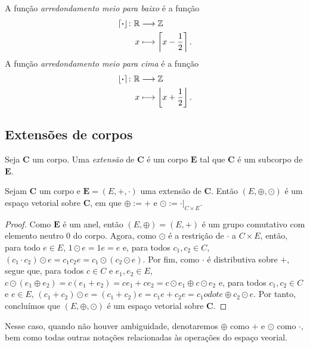 \begin{definition}
A função \emph{arredondamento meio para baixo} é a função
	\begin{align*}
	{\left\lceil{\bm{\cdot}}\right\rfloor}\colon {\mathbb{R}} &\longrightarrow {\mathbb{Z}} \\{x} &\longmapsto \left\lceil{x-\frac{1}{2}}\right\rceil.
	\end{align*}
A função \emph{arredondamento meio para cima} é a função
	\begin{align*}
	{\left\lfloor{\bm{\cdot}}\right\rceil}\colon {\mathbb{R}} &\longrightarrow {\mathbb{Z}} \\{x} &\longmapsto \left\lfloor{x+\frac{1}{2}}\right\rfloor.
	\end{align*}
\end{definition}




\subsection{Extensões de corpos}

\begin{definition}
	Seja $\bm C$ um corpo. Uma \emph{extensão} de $\bm C$ é um corpo $\bm E$ tal que $\bm C$ é um subcorpo de $\bm E$.
\end{definition}

\begin{proposition}
	Sejam $\bm C$ um corpo e $\bm E = (E,+,\cdot)$ uma extensão de $\bm C$. Então $(E,\oplus,\odot)$ é um espaço vetorial sobre $\bm C$, em que $\oplus := +$ e $\odot := \cdot|_{C \times E}$.
\end{proposition}
\begin{proof}
	Como $\bm E$ é um anel, então $(E,\oplus)=(E,+)$ é um grupo comutativo com elemento neutro $0$ do corpo. Agora, como $\odot$ é a restrição de $\cdot$ a $C \times E$, então, para todo $e \in E$, $1 \odot e = 1e = e$ e, para todos $c_1,c_2 \in C$, $(c_1 \cdot c_2) \odot e = c_1c_2e = c_1 \odot (c_2 \odot e)$. Por fim, como $\cdot$ é distributiva sobre $+$, segue que, para todos $c \in C$ e $e_1,e_2 \in E$, $c \odot (e_1 \oplus e_2) = c(e_1+e_2) = ce_1+ce_2 = c \odot e_1 \oplus c \odot e_2$ e, para todos $c_1,c_2 \in C$ e $e \in E$, $(c_1+c_2) \odot e = (c_1+c_2)e = c_1e+c_2e = c_1 odot e \oplus c_2 \odot e$. Por tanto, concluímos que $(E,\oplus,\odot)$ é um espaço vetorial sobre $\bm C$.
\end{proof}

\begin{notation}
	Nesse caso, quando não houver ambiguidade, denotaremos $\oplus$ como $+$ e $\odot$ como $\cdot$, bem como todas outras notações relacionadas às operações do espaço veorial.
\end{notation}

